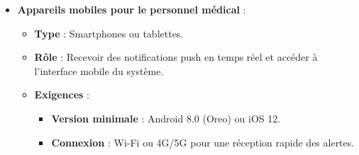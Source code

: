 \begin{itemize}
    \item \textbf{Appareils mobiles pour le personnel médical} :
    \begin{itemize}
        \item \textbf{Type} : Smartphones ou tablettes.
        \item \textbf{Rôle} : Recevoir des notifications push en temps réel et accéder à l'interface mobile du système.
        \item \textbf{Exigences} :
        \begin{itemize}
            \item \textbf{Version minimale} : Android 8.0 (Oreo) ou iOS 12.
            \item \textbf{Connexion} : Wi-Fi ou 4G/5G pour une réception rapide des alertes.
        \end{itemize}
    \end{itemize}
\end{itemize}